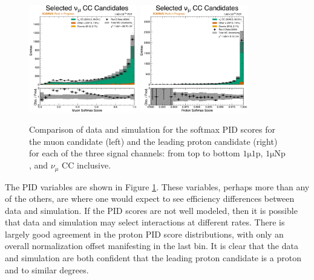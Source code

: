 \begin{figure}[!htb]
    \\
    \includegraphics[width=0.42\textwidth]{figures/data_mc_comparisons/datamc_hist1d_1muX_muon_softmax.pdf}
    \includegraphics[width=0.42\textwidth]{figures/data_mc_comparisons/datamc_hist1d_1muX_proton_softmax.pdf}
    \caption{Comparison of data and simulation for the softmax PID scores for the muon candidate (left) and the leading proton candidate (right) for each of the three signal channels: from top to bottom $\mathrm{1\mu 1p}$, $\mathrm{1\mu Np}$, and $\nu_\mu$ CC inclusive.}
    \label{fig:datamc_softmax_pid}
\end{figure}

The PID variables are shown in Figure \ref{fig:datamc_softmax_pid}. These variables, perhaps more than any of the others, are where one would expect to see efficiency differences between data and simulation. If the PID scores are not well modeled, then it is possible that data and simulation may select interactions at different rates. There is largely good agreement in the proton PID score distributions, with only an overall normalization offset manifesting in the last bin. It is clear that the data and simulation are both confident that the leading proton candidate is a proton and to similar degrees.

